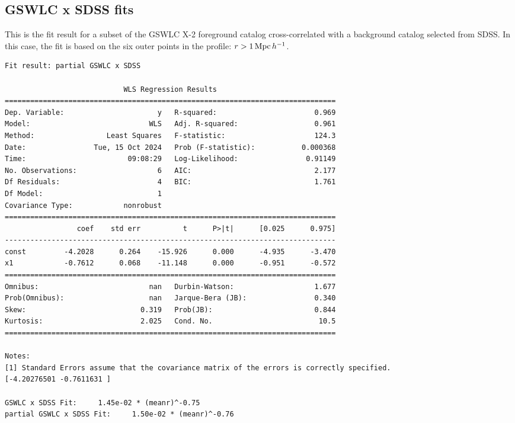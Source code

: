 \documentclass[11pt, oneside]{article}   	%
\begin{document}
\subsection{GSWLC x SDSS fits}\label{appx:GwslcFit}
This is the fit result for a subset of the GSWLC X-2 foreground catalog cross-correlated 
with a background catalog selected from SDSS. In this case, the fit is based on the 
six outer points in the profile: $ r > 1 \, {\rm Mpc} \, h^{-1}$. 

\small 
\begin{verbatim}
Fit result: partial GSWLC x SDSS

                            WLS Regression Results                            
==============================================================================
Dep. Variable:                      y   R-squared:                       0.969
Model:                            WLS   Adj. R-squared:                  0.961
Method:                 Least Squares   F-statistic:                     124.3
Date:                Tue, 15 Oct 2024   Prob (F-statistic):           0.000368
Time:                        09:08:29   Log-Likelihood:                0.91149
No. Observations:                   6   AIC:                             2.177
Df Residuals:                       4   BIC:                             1.761
Df Model:                           1                                         
Covariance Type:            nonrobust                                         
==============================================================================
                 coef    std err          t      P>|t|      [0.025      0.975]
------------------------------------------------------------------------------
const         -4.2028      0.264    -15.926      0.000      -4.935      -3.470
x1            -0.7612      0.068    -11.148      0.000      -0.951      -0.572
==============================================================================
Omnibus:                          nan   Durbin-Watson:                   1.677
Prob(Omnibus):                    nan   Jarque-Bera (JB):                0.340
Skew:                           0.319   Prob(JB):                        0.844
Kurtosis:                       2.025   Cond. No.                         10.5
==============================================================================

Notes:
[1] Standard Errors assume that the covariance matrix of the errors is correctly specified.
[-4.20276501 -0.7611631 ]

GSWLC x SDSS Fit:     1.45e-02 * (meanr)^-0.75
partial GSWLC x SDSS Fit:     1.50e-02 * (meanr)^-0.76
\end{verbatim}
\normalsize 
\end{document}
